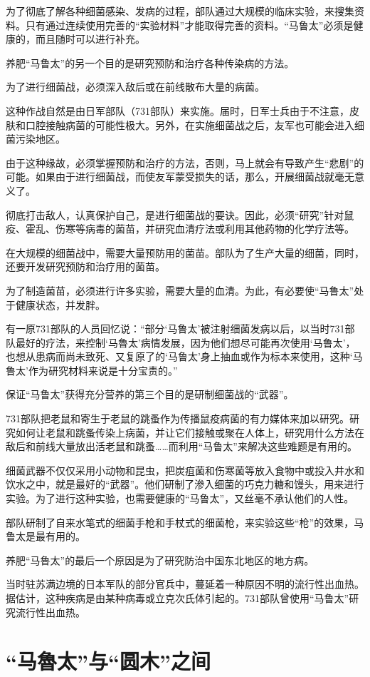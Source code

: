 \documentclass[a4paper,12pt,UTF8,twoside]{ctexbook}
\begin{document}
为了彻底了解各种细菌感染、发病的过程，部队通过大规模的临床实验，来搜集资料。只有通过连续使用完善的“实验材料”才能取得完善的资料。“马鲁太”必须是健康的，而且随时可以进行补充。

养肥“马鲁太”的另一个目的是研究预防和治疗各种传染病的方法。

为了进行细菌战，必须深入敌后或在前线散布大量的病菌。

这种作战自然是由日军部队（731部队）来实施。届时，日军士兵由于不注意，皮肤和口腔接触病菌的可能性极大。另外，在实施细菌战之后，友军也可能会进入细菌污染地区。

由于这种缘故，必须掌握预防和治疗的方法，否则，马上就会有导致产生“悲剧”的可能。如果由于进行细菌战，而使友军蒙受损失的话，那么，开展细菌战就毫无意义了。

彻底打击敌人，认真保护自己，是进行细菌战的要诀。因此，必须“研究”针对鼠疫、霍乱、伤寒等病毒的菌苗，并研究血清疗法或利用其他药物的化学疗法等。

在大规模的细菌战中，需要大量预防用的菌苗。部队为了生产大量的细菌，同时，还要开发研究预防和治疗用的菌苗。

为了制造菌苗，必须进行许多实验，需要大量的血清。为此，有必要使“马鲁太”处于健康状态，并发胖。

有一原731部队的人员回忆说：“部分‘马鲁太’被注射细菌发病以后，以当时731部队最好的疗法，来控制‘马魯太’病情发展，因为他们想尽可能再次使用‘马鲁太’，也想从患病而尚未致死、又复原了的‘马鲁太’身上抽血或作为标本来使用，这种‘马鲁太’作为研究材料来说是十分宝责的。”

保证“马鲁太”获得充分营养的第三个目的是研制细菌战的“武器”。

731部队把老鼠和寄生于老鼠的跳蚤作为传播鼠疫病菌的有力媒体来加以研究。研究如何让老鼠和跳蚤传染上病菌，并让它们接触或聚在人体上，研究用什么方法在敌后和前线大量放出活老鼠和跳蚤……而利用“马鲁太”来解决这些难题是有用的。

细菌武器不仅仅采用小动物和昆虫，把炭疽菌和伤寒菌等放入食物中或投入井水和饮水之中，就是最好的“武器”。他们研制了滲入细菌的巧克力糖和馒头，用来进行实验。为了进行这种实验，也需要健康的“马鲁太”，又丝毫不承认他们的人性。

部队研制了自来水笔式的细菌手枪和手杖式的细菌枪，来实验这些“枪”的效果，马鲁太是最有用的。

养肥“马魯太”的最后一个原因是为了研究防治中国东北地区的地方病。

当时驻苏满边境的日本军队的部分官兵中，蔓延着一种原因不明的流行性出血热。据估计，这种疾病是由某种病毒或立克次氏体引起的。731部队曾使用“马鲁太”研究流行性出血热。

\section{“马魯太”与“圆木”之间}
\end{document}
